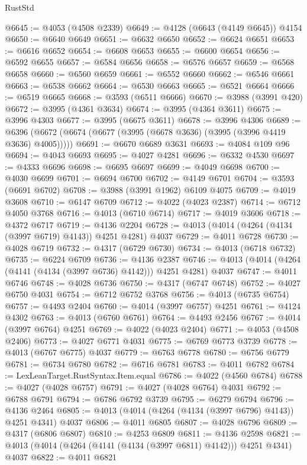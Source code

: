 \begin{lexlean}{RustStd}
\begin{coremodule}
@6645 := @4053 (@4508 @2339)
@6649 := @4128 (@6643 (@4149 @6645)) @4154
@6650 := @6640 @6649
@6651 := @6632 @6650
@6652 := @6624 @6651
@6653 := @6616 @6652
@6654 := @6608 @6653
@6655 := @6600 @6654
@6656 := @6592 @6655
@6657 := @6584 @6656
@6658 := @6576 @6657
@6659 := @6568 @6658
@6660 := @6560 @6659
@6661 := @6552 @6660
@6662 := @6546 @6661
@6663 := @6538 @6662
@6664 := @6530 @6663
@6665 := @6521 @6664
@6666 := @6519 @6665
@6668 := @3593 (@6511 @6666)
@6670 := @3988 (@3991 @420)
@6672 := @3995 (@4361 @3634)
@6674 := @3995 (@4364 @3611)
@6675 := @3996 @4303
@6677 := @3995 (@6675 @3611)
@6678 := @3996 @4306
@6689 := @6396 (@6672 (@6674 (@6677 (@3995 (@6678 @3636) (@3995 (@3996 @4419 @3636) @4005)))))
@6691 := @6670 @6689 @3631
@6693 := @4084 @109 @96
@6694 := @4043 @6693
@6695 := @4027 @4281
@6696 := @6332 @4530
@6697 := @4333 @6696
@6698 := @6695 @6697
@6699 := @4049 @6698
@6700 := @4030 @6699
@6701 := @6694 @6700
@6702 := @4149 @6701
@6704 := @3593 (@6691 @6702)
@6708 := @3988 (@3991 @1962) @6109 @4075
@6709 := @4019 @3608
@6710 := @6147 @6709
@6712 := @4022 (@4023 @2387)
@6714 := @6712 @4050 @3768
@6716 := @4013 (@6710 @6714)
@6717 := @4019 @3606
@6718 := @4372 @6717
@6719 := @4136 @2204
@6728 := @4013 (@4014 (@4264 (@4134 (@3997 @6719) @4143)) @4251 @4281) @4037
@6729 := @4011 @6728
@6730 := @4028 @6719
@6732 := @4317 (@6729 @6730)
@6734 := @4013 (@6718 @6732)
@6735 := @6224 @6709
@6736 := @4136 @2387
@6746 := @4013 (@4014 (@4264 (@4141 (@4134 (@3997 @6736) @4142))) @4251 @4281) @4037
@6747 := @4011 @6746
@6748 := @4028 @6736
@6750 := @4317 (@6747 @6748)
@6752 := @4027 @6750 @4031
@6754 := @6712 @6752 @3768
@6756 := @4013 (@6735 @6754)
@6757 := @4493 @2404
@6760 := @4014 (@3997 @6757) @4251
@6761 := @4124 @4302
@6763 := @4013 (@6760 @6761)
@6764 := @4493 @2456
@6767 := @4014 (@3997 @6764) @4251
@6769 := @4022 (@4023 @2404)
@6771 := @4053 (@4508 @2406)
@6773 := @4027 @6771 @4031
@6775 := @6769 @6773 @3739
@6778 := @4013 (@6767 @6775) @4037
@6779 := @6763 @6778
@6780 := @6756 @6779
@6781 := @6734 @6780
@6782 := @6716 @6781
@6783 := @4011 @6782
@6784 := LexLeanTarget.RustSyntax.Item.equal
@6786 := @4022 (@4560 @6784)
@6788 := @4027 (@4028 @6757)
@6791 := @4027 (@4028 @6764) @4031
@6792 := @6788 @6791
@6794 := @6786 @6792 @3739
@6795 := @6279 @6794
@6796 := @4136 @2464
@6805 := @4013 (@4014 (@4264 (@4134 (@3997 @6796) @4143)) @4251 @4341) @4037
@6806 := @4011 @6805
@6807 := @4028 @6796
@6809 := @4317 (@6806 @6807)
@6810 := @4253 @6809
@6811 := @4136 @2598
@6821 := @4013 (@4014 (@4264 (@4141 (@4134 (@3997 @6811) @4142))) @4251 @4341) @4037
@6822 := @4011 @6821

\end{coremodule}
\end{lexlean}
